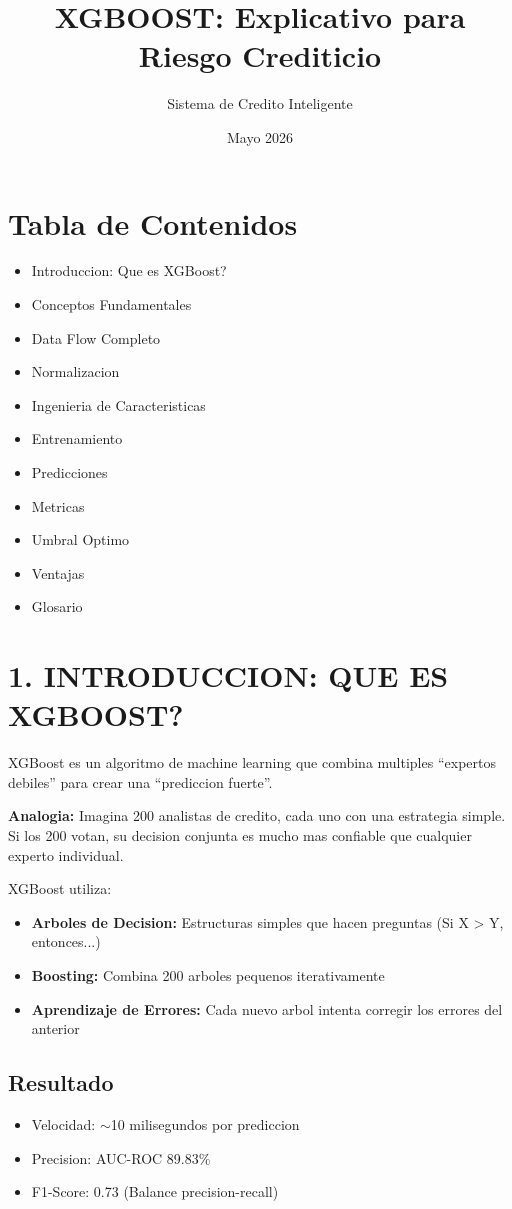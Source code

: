 \documentclass[11pt]{article}
\title{\textbf{XGBOOST: Explicativo para Riesgo Crediticio}}
\author{Sistema de Credito Inteligente}
\date{Mayo 2026}
\begin{document}
\maketitle

\section*{Tabla de Contenidos}
\begin{itemize}
\item Introduccion: Que es XGBoost?
\item Conceptos Fundamentales
\item Data Flow Completo
\item Normalizacion
\item Ingenieria de Caracteristicas
\item Entrenamiento
\item Predicciones
\item Metricas
\item Umbral Optimo
\item Ventajas
\item Glosario
\end{itemize}

\section*{1. INTRODUCCION: QUE ES XGBOOST?}

XGBoost es un algoritmo de machine learning que combina multiples ``expertos debiles'' para crear una ``prediccion fuerte''.

\textbf{Analogia:} Imagina 200 analistas de credito, cada uno con una estrategia simple. Si los 200 votan, su decision conjunta es mucho mas confiable que cualquier experto individual.

XGBoost utiliza:
\begin{itemize}
\item \textbf{Arboles de Decision:} Estructuras simples que hacen preguntas (Si X > Y, entonces...)
\item \textbf{Boosting:} Combina 200 arboles pequenos iterativamente
\item \textbf{Aprendizaje de Errores:} Cada nuevo arbol intenta corregir los errores del anterior
\end{itemize}

\subsection*{Resultado}
\begin{itemize}
\item Velocidad: $\sim$10 milisegundos por prediccion
\item Precision: AUC-ROC 89.83\%
\item F1-Score: 0.73 (Balance precision-recall)
\end{itemize}
\end{document}
